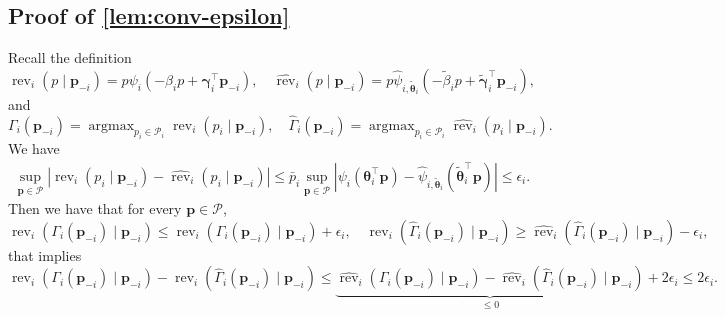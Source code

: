 \documentclass{article} %
\begin{document}
\subsection{Proof of \cref{lem:conv-epsilon}}
Recall the definition
$$
\operatorname{rev}_i(p \mid \mathbf{p}_{-i}) =  p\psi_i( -\beta_i p+\boldsymbol{\gamma}_i^{\top} \mathbf{p}_{-i}),\quad \widehat{ \operatorname{rev}}_i(p \mid \mathbf{p}_{-i}) =  p\widehat{\psi}_{i,\widetilde{\boldsymbol{\theta}}_i}( -\widetilde{\beta}_i p+\widetilde{\boldsymbol{\gamma}}_i^{\top} \mathbf{p}_{-i}),
$$
and
$$
\Gamma_i(\mathbf{p}_{-i}) = \operatorname{argmax}_{p_i \in \mathcal{P}_i} \operatorname{rev}_i(p_i \mid \mathbf{p}_{-i}), \quad \widehat{\Gamma}_i(\mathbf{p}_{-i})
 =\operatorname{argmax}_{p_i \in \mathcal{P}_i} \widehat{\operatorname{rev}}_i(p_i \mid \mathbf{p}_{-i}).
$$
\noindent
We have
$$
\begin{aligned}
\sup_{\mathbf{p} \in \mathcal{P}}| \operatorname{rev}_i(p_i \mid \mathbf{p}_{-i}) - \widehat{ \operatorname{rev}}_i(p_i \mid \mathbf{p}_{-i})|\leq \bar{p}_i \sup_{\mathbf{p} \in \mathcal{P}}|\psi_i(\boldsymbol{\theta}_i^{\top}\mathbf{p})-\widehat{\psi}_{i,\widetilde{\boldsymbol{\theta}}_i}(\widetilde{\boldsymbol{\theta}}_i^{\top}\mathbf{p})| \leq \epsilon_i.
\end{aligned}
$$
Then we have that for every $\mathbf{p} \in \mathcal{P}$,
$$
\operatorname{rev}_i(\Gamma_i(\mathbf{p}_{-i}) \mid \mathbf{p}_{-i}) \leq  \widehat{ \operatorname{rev}}_i(\Gamma_i(\mathbf{p}_{-i}) \mid \mathbf{p}_{-i}) +\epsilon_i,\quad \operatorname{rev}_i(\widehat{\Gamma}_i(\mathbf{p}_{-i}) \mid \mathbf{p}_{-i}) \geq  \widehat{ \operatorname{rev}}_i(\widehat{\Gamma}_i(\mathbf{p}_{-i}) \mid \mathbf{p}_{-i}) -\epsilon_i,
$$
that implies 
$$
\operatorname{rev}_i(\Gamma_i(\mathbf{p}_{-i}) \mid \mathbf{p}_{-i})-\operatorname{rev}_i(\widehat{\Gamma}_i(\mathbf{p}_{-i}) \mid \mathbf{p}_{-i}) \leq \underset{\leq 0}{\underbrace{\widehat{ \operatorname{rev}}_i(\Gamma_i(\mathbf{p}_{-i}) \mid \mathbf{p}_{-i}) -\widehat{ \operatorname{rev}}_i(\widehat{\Gamma}_i(\mathbf{p}_{-i}) \mid \mathbf{p}_{-i})}} +2\epsilon_i \leq 2\epsilon_i .
$$
\end{document}
